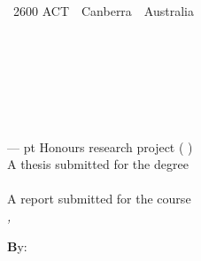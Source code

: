 
%
%


\thispagestyle{empty}



\ifStandardTitle %

\noindent
\begin{minipage}[t]{6cm}%
{\footnotesize%
 \\
~2600 ACT~\textbar~Canberra~\textbar~Australia}
\end{minipage}%
\hfill%
\begin{minipage}[b]{10cm}%
\hfill{}
\end{minipage}


\ \\[2em]
\phantom{x} \hfill\parbox[t]{44.5 mm}{\bfseries \School\\[.5em]
\hfill\mdseries \College}\\[6 em]
\hfill

\noindent
\parbox{140mm}{\sffamily \bfseries \Huge %
\ProjectTitle%
}\\[.75 em]
{--- \ProjectPoints{} pt \ifHonoursThesis Honours \else research \fi project (\Semester{} \Year)}\\[3 em]


\ifHonoursThesis%
A thesis submitted for the degree\\
\emph{\Degree}\\[3 em]
\else%
A report submitted for the course\\
\emph{\CourseCode, \CourseName}\\[3 em]
\fi




\noindent
{\footnotesize \textbf By:}\\
\AuthorName\\[2em]



